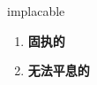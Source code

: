
\begin{frame}
{\huge implacable}
\begin{center}
\begin{enumerate}\Large
  \item \textbf{固执的}
  \item \textbf{无法平息的}
\end{enumerate}
\end{center}
\end{frame}
